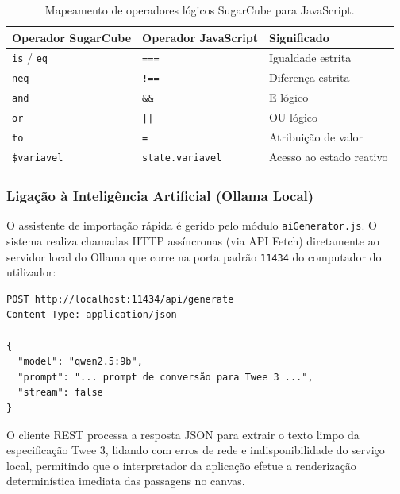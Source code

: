 \begin{table}[H]
    \centering
    \caption{Mapeamento de operadores lógicos SugarCube para JavaScript.}
    \label{tab:operadores-sugarcube}
    \begin{tabular}{lll}
        \toprule
        \textbf{Operador SugarCube} & \textbf{Operador JavaScript} & \textbf{Significado} \\
        \midrule
        \texttt{is} / \texttt{eq} & \texttt{===} & Igualdade estrita \\
        \texttt{neq} & \texttt{!==} & Diferença estrita \\
        \texttt{and} & \texttt{\&\&} & E lógico \\
        \texttt{or} & \texttt{||} & OU lógico \\
        \texttt{to} & \texttt{=} & Atribuição de valor \\
        \texttt{\$variavel} & \texttt{state.variavel} & Acesso ao estado reativo \\
        \bottomrule
    \end{tabular}
\end{table}

\subsubsection{Ligação à Inteligência Artificial (Ollama Local)}
O assistente de importação rápida é gerido pelo módulo \texttt{aiGenerator.js}. O sistema realiza chamadas HTTP assíncronas (via API Fetch) diretamente ao servidor local do Ollama que corre na porta padrão \texttt{11434} do computador do utilizador:
\begin{verbatim}
POST http://localhost:11434/api/generate
Content-Type: application/json

{
  "model": "qwen2.5:9b",
  "prompt": "... prompt de conversão para Twee 3 ...",
  "stream": false
}
\end{verbatim}

O cliente REST processa a resposta JSON para extrair o texto limpo da especificação Twee 3, lidando com erros de rede e indisponibilidade do serviço local, permitindo que o interpretador da aplicação efetue a renderização determinística imediata das passagens no canvas.

